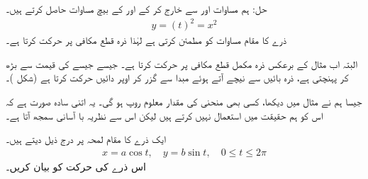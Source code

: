 حل:\quad
ہم مساوات  اور  سے  خارج کر کے  اور  کے بیچ مساوات حاصل کرتے ہیں۔
\begin{align*}
y=(t)^2=x^2
\end{align*}
ذرے کا مقام مساوات  کو مطمئن کرتی ہے لہٰذا ذرہ قطع مکافی  پر حرکت کرتا ہے۔

البتہ اب مثال  کے برعکس ذرہ مکمل قطع مکافی پر حرکت کرتا ہے۔ جیسے جیسے  کی قیمت  سے بڑھ کر   پہنچتی ہے، ذرہ بائیں سے نیچے آتے ہوئے مبدا سے گزر کر اوپر دائیں حرکت کرتا ہے (شکل )۔

جیسا ہم نے مثال  میں دیکھا، کسی بھی منحنی  کی مقدار معلوم روپ  ہو گی۔ یہ اتنی سادہ صورت ہے کہ اس کو ہم حقیقت میں استعمال نہیں کرتے ہیں لیکن اس سے نظریہ با آسانی سمجھ آتا ہے۔

ایک ذرے کا مقام لمحہ  پر   درج ذیل  دیتے ہیں۔
\begin{align*}
x=a\cos t,\quad y=b\sin t,\quad 0\le t\le 2\pi
\end{align*}
اس ذرے کی حرکت کو بیان کریں۔

